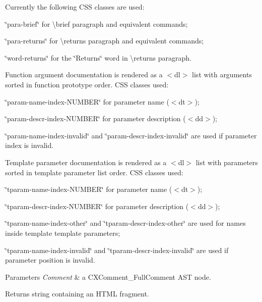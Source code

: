 Currently the following C\+SS classes are used\+: \begin{DoxyItemize}
\item \char`\"{}para-\/brief\char`\"{} for \textbackslash{}brief paragraph and equivalent commands; \item \char`\"{}para-\/returns\char`\"{} for \textbackslash{}returns paragraph and equivalent commands; \item \char`\"{}word-\/returns\char`\"{} for the \char`\"{}\+Returns\char`\"{} word in \textbackslash{}returns paragraph.\end{DoxyItemize}
Function argument documentation is rendered as a $<$dl$>$ list with arguments sorted in function prototype order. C\+SS classes used\+: \begin{DoxyItemize}
\item \char`\"{}param-\/name-\/index-\/\+N\+U\+M\+B\+E\+R\char`\"{} for parameter name ($<$dt$>$); \item \char`\"{}param-\/descr-\/index-\/\+N\+U\+M\+B\+E\+R\char`\"{} for parameter description ($<$dd$>$); \item \char`\"{}param-\/name-\/index-\/invalid\char`\"{} and \char`\"{}param-\/descr-\/index-\/invalid\char`\"{} are used if parameter index is invalid.\end{DoxyItemize}
Template parameter documentation is rendered as a $<$dl$>$ list with parameters sorted in template parameter list order. C\+SS classes used\+: \begin{DoxyItemize}
\item \char`\"{}tparam-\/name-\/index-\/\+N\+U\+M\+B\+E\+R\char`\"{} for parameter name ($<$dt$>$); \item \char`\"{}tparam-\/descr-\/index-\/\+N\+U\+M\+B\+E\+R\char`\"{} for parameter description ($<$dd$>$); \item \char`\"{}tparam-\/name-\/index-\/other\char`\"{} and \char`\"{}tparam-\/descr-\/index-\/other\char`\"{} are used for names inside template template parameters; \item \char`\"{}tparam-\/name-\/index-\/invalid\char`\"{} and \char`\"{}tparam-\/descr-\/index-\/invalid\char`\"{} are used if parameter position is invalid.\end{DoxyItemize}

\begin{DoxyParams}{Parameters}
{\em Comment} & a {\ttfamily C\+X\+Comment\+\_\+\+Full\+Comment} A\+ST node.\\
\hline
\end{DoxyParams}
\begin{DoxyReturn}{Returns}
string containing an H\+T\+ML fragment. 
\end{DoxyReturn}
\mbox{\label{group__CINDEX__COMMENT_gac877b07be05f591fdfea05f466ed9395}} 
